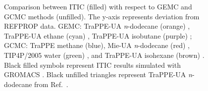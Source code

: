 \documentclass[5p,times]{elsarticle}
\begin{document}
\begin{figure}[]
\caption{Comparison between ITIC (filled) with respect to GEMC and GCMC methods (unfilled). The y-axis represents deviation from REFPROP data. 
GEMC: TraPPE-UA \textit{n}-dodecane  (orange) \cite{Martin1998}, TraPPE-UA ethane (cyan) \cite{Martin1998}, TraPPE-UA isobutane (purple) \cite{Wick2000};
GCMC: TraPPE methane\cite{Shen2008} (blue), Mie-UA \textit{n}-dodecane (red) \cite{Potoff2009}, TIP4P/2005 water (green) \cite{Shen2008}, and TraPPE-UA isohexane (brown) \cite{Mick2017}. Black filled symbols represent ITIC results simulated with GROMACS \cite{Lindahl2001}. Black unfilled triangles represent TraPPE-UA \textit{n}-dodecane from Ref.~\cite{Ungerer2000}.
}
\label{fig:EXAMPLE-SIM/Deviation-Psat-rhoL-rhoV}
\end{figure}
\end{document}
